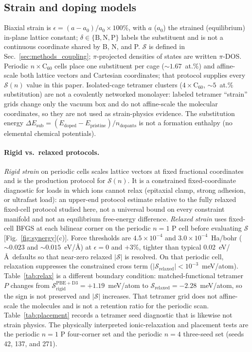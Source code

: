 \documentclass[%
 reprint,
 groupedaddress,
 amsmath,amssymb,
 aps,
 prb,
 floatfix,
]{revtex4-2}
\begin{document}
\subsection{Strain and doping models}
\label{sec:notation}
Biaxial strain is $\epsilon=(a-a_0)/a_0\times 100\%$, with $a$ ($a_0$) the strained (equilibrium) in-plane lattice constant; $\delta\in\{\mathrm{B},\mathrm{N},\mathrm{P}\}$ labels the substituent and is not a continuous coordinate shared by B, N, and P.
$\mathcal{S}$ is defined in Sec.~\ref{sec:methods_coupling}; $\pi$-projected densities of states are written $\pi$-DOS.
Periodic $n\times\mathrm{C}_{60}$ cells place one substituent per cage (${\sim}1.67$~at.\%) and affine-scale both lattice vectors and Cartesian coordinates; that protocol supplies every $\mathcal{S}(n)$ value in this paper.
Isolated-cage tetramer clusters ($4\times\mathrm{C}_{60}$, ${\sim}5$~at.\% substitution) are not a covalently networked monolayer: labeled tetramer ``strain'' grids change only the vacuum box and do not affine-scale the molecular coordinates, so they are not used as strain-physics evidence.
The substitution energy $\Delta E_{\mathrm{sub}}=(E_{\mathrm{doped}}-E_{\mathrm{pristine}})/n_{\mathrm{dopants}}$ is not a formation enthalpy (no elemental chemical potentials).

\paragraph{Rigid vs.\ relaxed protocols.}
\emph{Rigid strain} on periodic cells scales lattice vectors at fixed fractional coordinates and is the production protocol for $\mathcal{S}(n)$.
It is a constrained fixed-coordinate diagnostic for loads in which ions cannot relax (epitaxial clamp, strong adhesion, or ultrafast load): an upper-end protocol estimate relative to the fully relaxed fixed-cell protocol studied here, not a universal bound on every constraint manifold and not an equilibrium free-energy difference.
\emph{Relaxed strain} uses fixed-cell BFGS at each bilinear corner on the periodic $n{=}1$ P cell before evaluating $\mathcal{S}$ [Fig.~\ref{fig:synergy}(c)].
Force thresholds are $4.5\times10^{-4}$ and $3.0\times10^{-4}$~Ha/bohr (${\sim}0.023$ and ${\sim}0.015$~eV/\AA) at $\epsilon{=}0$ and $+3$\%, tighter than typical 0.02~eV/\AA\ defaults so that near-zero relaxed $|\mathcal{S}|$ is resolved.
On that periodic cell, relaxation suppresses the constrained cross term ($|\mathcal{S}_{\mathrm{relaxed}}|<10^{-3}$~meV/atom).
Table~\ref{tab:relax} is a different boundary condition: matched-functional tetramer $P$ changes from $\mathcal{S}_{\mathrm{rigid}}^{\mathrm{PBE+D3}}=+1.19$~meV/atom to $\mathcal{S}_{\mathrm{relaxed}}=-2.28$~meV/atom, so the sign is not preserved and $|\mathcal{S}|$ increases.
That tetramer grid does not affine-scale the molecules and is not a retention ratio for the periodic scan.
Table~\ref{tab:placement} records a tetramer seed diagnostic that is likewise not strain physics.
The physically interpreted ionic-relaxation and placement tests are the periodic $n{=}1$ P four-corner set and the periodic $n{=}4$ three-seed set (seeds 42, 137, and 271).
\end{document}
